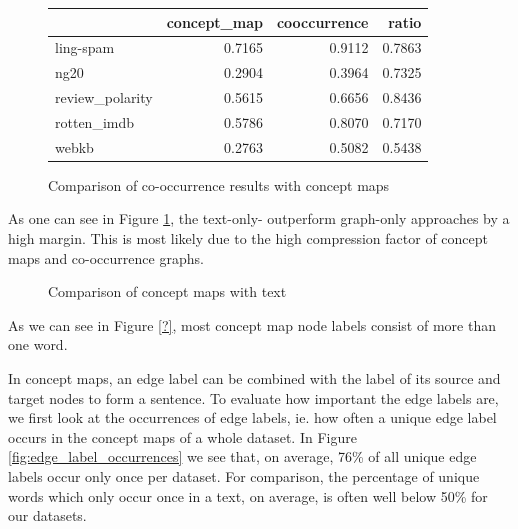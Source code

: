 


\begin{figure}[ht]
\centering
\begin{tabular}{lrrr}
&  concept\_map &  cooccurrence &   ratio \\
\midrule
ling-spam       &  0.7165 &  0.9112 &  0.7863 \\
ng20            &  0.2904 &  0.3964 &  0.7325 \\
review\_polarity &  0.5615 &  0.6656 &  0.8436 \\
rotten\_imdb     &  0.5786 &  0.8070 &  0.7170 \\
webkb           &  0.2763 &  0.5082 &  0.5438 \\
\bottomrule
\end{tabular}
\caption{Comparison of co-occurrence results with concept maps}
\end{figure}

As one can see in Figure \ref{fig:results_cmap_vs_text}, the text-only- outperform graph-only approaches by a high margin.
This is most likely due to the high compression factor of concept maps and co-occurrence graphs.

\begin{figure}[ht]
\centering
\missingfigure[figcolor=white]{}
\caption{Comparison of concept maps with text}
\label{fig:results_cmap_vs_text}
\end{figure}

As we can see in Figure \ref{?}, most concept map node labels consist of more than one word. 


In concept maps, an edge label can be combined with the label of its source and target nodes to form a sentence.
To evaluate how important the edge labels are, we first look at the occurrences of edge labels, ie. how often a unique edge label occurs in the concept maps of a whole dataset.
In Figure \ref{fig:edge_label_occurrences} we see that, on average, 76\% of all unique edge labels occur only once per dataset. For comparison, the percentage of unique words which only occur once in a text, on average, is often well below 50\% for our datasets.


